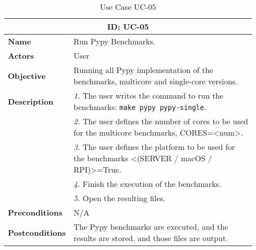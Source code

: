 \begin{table}[H]
    \centering
    \begin{tabular}{l p{10cm}}
        \toprule
        \multicolumn{2}{c}{\textbf{ID: UC-05}} \\
        \toprule
        \textbf{Name}                         &  Run Pypy Benchmarks. \\
        \textbf{Actors}                       &  User \\
        \textbf{Objective}                    &  Running all Pypy implementation of the benchmarks, multicore and single-core versions. \\
        \multirow{1}{*}{\textbf{Description}} & \textsl{1.} The user writes the command to run the benchmarks: \texttt{make pypy pypy-single}.\\
                                              & \textsl{2.} The user defines the number of cores to be used for the multicore benchmarks, CORES=<num>.\\
                                              & \textsl{3.} The user defines the platform to be used for the benchmarks <(SERVER / macOS / RPI)>=True.\\
                                              & \textsl{4.} Finish the execution of the benchmarks.\\
                                              & \textsl{5.} Open the resulting files.\\ 
        \textbf{Preconditions}                &  N/A \\
        \textbf{Postconditions}               &  The Pypy benchmarks are executed, and the results are stored, and those files are output. \\
    \end{tabular}
    \caption{Use Case UC-05}
    \label{tab:uc-05}
\end{table}


